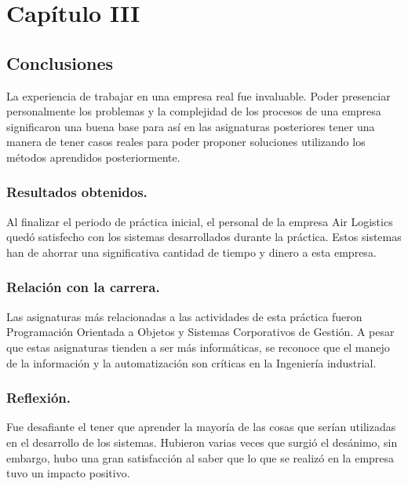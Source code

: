 \chapter*{Capítulo III}
\setcounter{chapter}{3} %
\setcounter{section}{0} %
\fancyhf{}
\fancyfoot[R]{\thepage} 
\section{Conclusiones}
La experiencia de trabajar en una empresa real fue invaluable. Poder presenciar personalmente los problemas y la complejidad de los procesos de una empresa significaron una buena base para así en las asignaturas posteriores tener una manera de tener casos reales para poder proponer soluciones utilizando los métodos aprendidos posteriormente. 
\subsection{Resultados obtenidos.}
Al finalizar el periodo de práctica inicial, el personal de la empresa Air Logistics quedó satisfecho con los sistemas desarrollados durante la práctica. Estos sistemas han de ahorrar una significativa cantidad de tiempo y dinero a esta empresa.
\subsection{Relación con la carrera.}
Las asignaturas más relacionadas a las actividades de esta práctica fueron Programación Orientada a Objetos y Sistemas Corporativos de Gestión. A pesar que estas asignaturas tienden a ser más informáticas, se reconoce que el manejo de la información y la automatización son críticas en la Ingeniería industrial.
\subsection{Reflexión.}
Fue desafiante el tener que aprender la mayoría de las cosas que serían utilizadas en el desarrollo de los sistemas. Hubieron varias veces que surgió el desánimo, sin embargo, hubo una gran satisfacción al saber que lo que se realizó en la empresa tuvo un impacto positivo.
